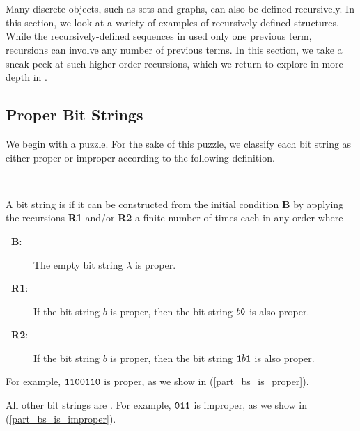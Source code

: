 \section{\secrecdefn}
\label{sec_rec_def_structures}

Many discrete objects, such as sets and graphs, %
can also be defined recursively. In this section, we look at a variety of examples of recursively-defined structures. While the recursively-defined sequences in  used only one previous term, recursions can involve any number of previous terms.  In this section, we take a sneak peek at such higher order recursions, which we return to explore in more depth in .


\newcommand{\subproperbs}{Proper Bit Strings}
\subsection{\subproperbs}
\label{sub_proper_bit_strings}

We begin with a puzzle. For the sake of this puzzle, we classify each bit string as either proper or improper according to the following definition.

    \begin{defn}
    \label{defn_proper_bs}
    ~
        \begin{apart}
            \item A bit string is  if it can be constructed from the initial condition \textbf{B} by applying the recursions \textbf{R1} and/or \textbf{R2} a finite number of times each in any order where
                \begin{description}
                    \item [\textbf{~\quad B}:] The empty bit string $\lambda$ is proper.
                    \item [\textbf{~\quad R1}:] If the bit string $b$ is proper, then the bit string $b\texttt{0}$ is also proper. 
                    \item [\textbf{~\quad R2}:] If the bit string $b$ is proper, then the bit string $\texttt{1}b\texttt{1}$ is also proper.
                \end{description} 
                For example, $\texttt{1100110}$ is proper, as we show in  (\ref{part_bs_is_proper}).  
                
            \item All other bit strings are . For example, $\texttt{011}$ is improper, as we show in  (\ref{part_bs_is_improper}). 
        \end{apart}
    \end{defn}

